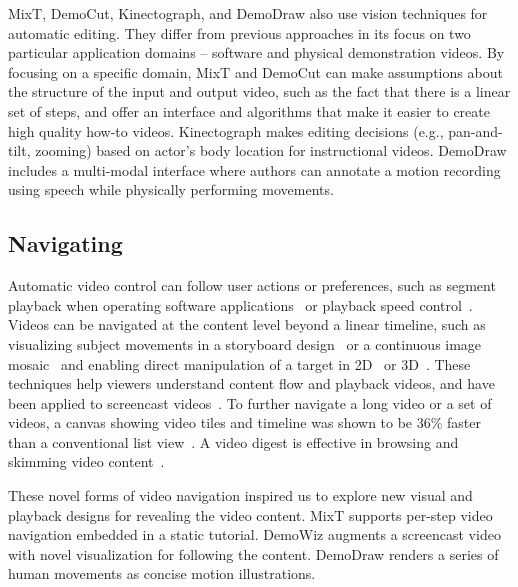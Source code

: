 MixT, DemoCut, Kinectograph, and DemoDraw also use vision techniques for automatic editing. They differ from previous approaches in its focus on two particular application domains -- software and physical demonstration videos.
%
By focusing on a specific domain, MixT and DemoCut can make assumptions about the structure of the input and output video, such as the fact that there is a linear set of steps, and offer an interface and algorithms that make it easier to create high quality how-to videos.
%
Kinectograph makes editing decisions (e.g., pan-and-tilt, zooming) based on actor's body location for instructional videos.
%
DemoDraw includes a multi-modal interface where authors can annotate a motion recording using speech while physically performing movements.



\subsection{Navigating}
Automatic video control can follow user actions or preferences, such as segment playback when operating software applications~\cite{Pongnumkul:2011ju} or playback speed control~\cite{Cheng:2009:SUV:1518701.1518823}.
%
Videos can be navigated at the content level beyond a linear timeline, such as visualizing subject movements in a storyboard design~\cite{goldman2006schematic} or a continuous image mosaic~\cite{Teodosio:2005:SS:1047936.1047940} and enabling direct manipulation of a target in 2D~\cite{Dragicevic:2008:VBD:1357054.1357096,Goldman:2008:VOA:1449715.1449719,Karrer:2008:DDM:1357054.1357097} or 3D~\cite{Nguyen:2013:DMV:2470654.2466150}.
%
These techniques help viewers understand content flow and playback videos, and have been applied to screencast videos~\cite{Denoue:2013:RDM:2451176.2451190,Nguyen:2015:MST:2702123.2702209}.
%
To further navigate a long video or a set of videos, a canvas showing video tiles and timeline was shown to be 36\% faster than a conventional list view~\cite{Al-Hajri:2014:VPH:2611105.2557106}. A video digest is effective in browsing and skimming video content~\cite{Pavel:2014:VDB:2642918.2647400}.

These novel forms of video navigation inspired us to explore new visual and playback designs for revealing the video content.
%
MixT supports per-step video navigation embedded in a static tutorial.
%
DemoWiz augments a screencast video with novel visualization for following the content.
%
DemoDraw renders a series of human movements as concise motion illustrations.

